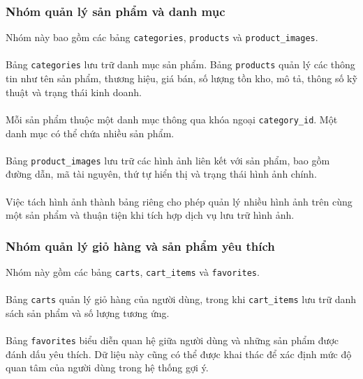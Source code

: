 \documentclass{report}
\begin{document}
\subsubsection{Nhóm quản lý sản phẩm và danh mục}
Nhóm này bao gồm các bảng \texttt{categories}, \texttt{products} và \texttt{product\_images}.\\\\
Bảng \texttt{categories} lưu trữ danh mục sản phẩm. Bảng \texttt{products} quản lý các thông tin như tên sản phẩm, thương hiệu, giá bán, số lượng tồn kho, mô tả, thông số kỹ thuật và trạng thái kinh doanh.\\\\
Mỗi sản phẩm thuộc một danh mục thông qua khóa ngoại \texttt{category\_id}. Một danh mục có thể chứa nhiều sản phẩm.\\\\
Bảng \texttt{product\_images} lưu trữ các hình ảnh liên kết với sản phẩm, bao gồm đường dẫn, mã tài nguyên, thứ tự hiển thị và trạng thái hình ảnh chính.\\\\
Việc tách hình ảnh thành bảng riêng cho phép quản lý nhiều hình ảnh trên cùng một sản phẩm và thuận tiện khi tích hợp dịch vụ lưu trữ hình ảnh.

\subsubsection{Nhóm quản lý giỏ hàng và sản phẩm yêu thích}
Nhóm này gồm các bảng \texttt{carts}, \texttt{cart\_items} và \texttt{favorites}.\\\\
Bảng \texttt{carts} quản lý giỏ hàng của người dùng, trong khi \texttt{cart\_items} lưu trữ danh sách sản phẩm và số lượng tương ứng.\\\\
Bảng \texttt{favorites} biểu diễn quan hệ giữa người dùng và những sản phẩm được đánh dấu yêu thích. Dữ liệu này cũng có thể được khai thác để xác định mức độ quan tâm của người dùng trong hệ thống gợi ý.\\\\
\end{document}
